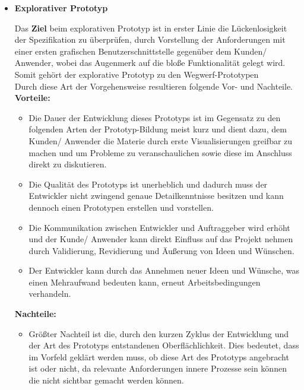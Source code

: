 \documentclass{swp1}
\begin{document}
\begin{itemize}
\item \textbf{Explorativer Prototyp}
 
Das \textbf{Ziel} beim explorativen Prototyp ist in erster Linie die Lückenlosigkeit der Spezifikation zu überprüfen, durch Vorstellung der Anforderungen mit einer ersten grafischen Benutzerschnittstelle gegenüber dem Kunden/ Anwender, wobei das Augenmerk auf die bloße Funktionalität gelegt wird. Somit gehört der explorative Prototyp zu den Wegwerf-Prototypen\\
Durch diese Art der Vorgehensweise resultieren folgende Vor- und Nachteile.\\

\textbf{Vorteile:}
\begin{itemize}
\item Die Dauer der Entwicklung dieses Prototyps ist im Gegensatz zu den folgenden Arten der Prototyp-Bildung meist kurz und dient dazu, dem Kunden/ Anwender die Materie durch erste Visualisierungen greifbar zu machen und um Probleme zu veranschaulichen sowie diese im Anschluss direkt zu diskutieren.
\end{itemize}

\begin{itemize}
\item Die Qualität des Prototyps ist unerheblich und dadurch muss der Entwickler nicht zwingend genaue Detailkenntnisse besitzen und kann dennoch einen Prototypen erstellen und  vorstellen.
\end{itemize} 

\begin{itemize}
\item Die Kommunikation zwischen Entwickler und Auftraggeber wird erhöht und der Kunde/ Anwender kann direkt Einfluss auf das Projekt nehmen durch Validierung, Revidierung und Äußerung von Ideen und Wünschen. 
\end{itemize}

\begin{itemize}
\item Der Entwickler kann durch das Annehmen neuer Ideen und Wünsche, was einen Mehraufwand bedeuten kann, erneut Arbeitsbedingungen verhandeln. 
\end{itemize}

\textbf{Nachteile:}
\begin{itemize}
\item Größter Nachteil ist die, durch den kurzen Zyklus der Entwicklung und der Art des Prototyps entstandenen Oberflächlichkeit. Dies bedeutet, dass im Vorfeld geklärt werden muss, ob diese Art des Prototyps angebracht ist oder nicht, da relevante Anforderungen innere Prozesse sein können die nicht sichtbar gemacht werden können. 
\end{itemize}


\end{itemize}
\end{document}
